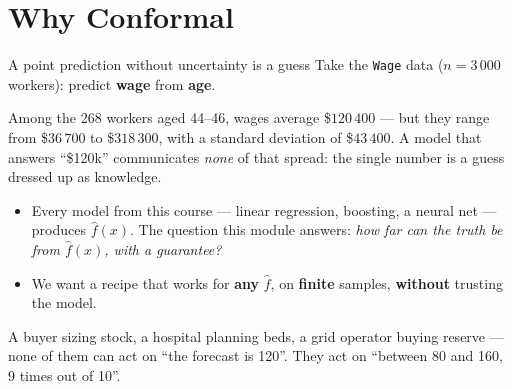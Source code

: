 \documentclass[aspectratio=169,11pt]{beamer}
\begin{document}
\section{Why Conformal}

\begin{frame}{A point prediction without uncertainty is a guess}
  Take the \texttt{Wage} data ($n = 3\,000$ workers): predict \textbf{wage} from
  \textbf{age}.
  \begin{numexample}
    Among the 268 workers aged 44--46, wages average \$$120\,400$ --- but they range
    from \$$36\,700$ to \$$318\,300$, with a standard deviation of \$$43\,400$.
    A model that answers ``\$120k'' communicates \emph{none} of that spread: the single
    number is a guess dressed up as knowledge.
  \end{numexample}
  \begin{itemize}
    \item Every model from this course --- linear regression, boosting, a neural net ---
          produces $\hat f(x)$. The question this module answers: \emph{how far can the
          truth be from $\hat f(x)$, with a guarantee?}
    \item We want a recipe that works for \textbf{any} $\hat f$, on \textbf{finite}
          samples, \textbf{without} trusting the model.
  \end{itemize}
  \begin{takeaway}
    A buyer sizing stock, a hospital planning beds, a grid operator buying reserve ---
    none of them can act on ``the forecast is 120''. They act on ``between 80 and 160,
    9 times out of 10''.
  \end{takeaway}
\end{frame}
\end{document}
